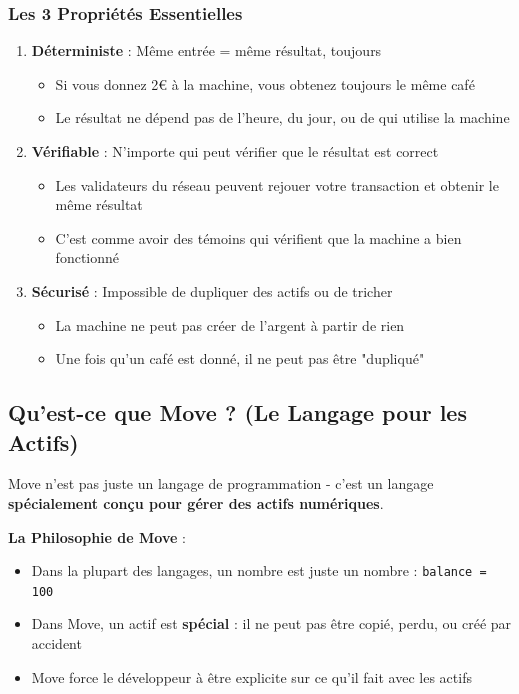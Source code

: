 \documentclass[11pt]{article}
\begin{document}
\subsubsection{Les 3 Propriétés Essentielles}

\begin{enumerate}
  \item \textbf{Déterministe} : Même entrée = même résultat, toujours
  \begin{itemize}
    \item Si vous donnez 2€ à la machine, vous obtenez toujours le même café
    \item Le résultat ne dépend pas de l'heure, du jour, ou de qui utilise la machine
  \end{itemize}
  
  \item \textbf{Vérifiable} : N'importe qui peut vérifier que le résultat est correct
  \begin{itemize}
    \item Les validateurs du réseau peuvent rejouer votre transaction et obtenir le même résultat
    \item C'est comme avoir des témoins qui vérifient que la machine a bien fonctionné
  \end{itemize}
  
  \item \textbf{Sécurisé} : Impossible de dupliquer des actifs ou de tricher
  \begin{itemize}
    \item La machine ne peut pas créer de l'argent à partir de rien
    \item Une fois qu'un café est donné, il ne peut pas être "dupliqué"
  \end{itemize}
\end{enumerate}

\subsection{Qu'est-ce que Move ? (Le Langage pour les Actifs)}

Move n'est pas juste un langage de programmation - c'est un langage \textbf{spécialement conçu pour gérer des actifs numériques}.

\begin{explainBox}
\textbf{La Philosophie de Move} :
\begin{itemize}
  \item Dans la plupart des langages, un nombre est juste un nombre : \texttt{balance = 100}
  \item Dans Move, un actif est \textbf{spécial} : il ne peut pas être copié, perdu, ou créé par accident
  \item Move force le développeur à être explicite sur ce qu'il fait avec les actifs
\end{itemize}
\end{explainBox}
\end{document}
